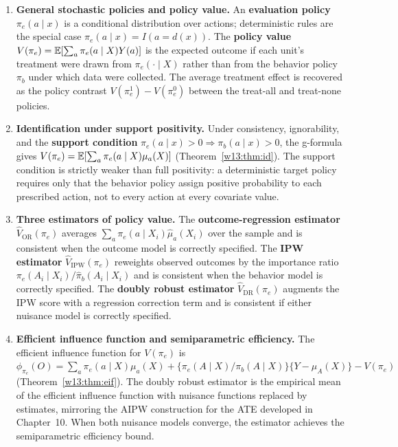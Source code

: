 \documentclass[master.tex]{subfiles}
\begin{document}
\begin{enumerate}

  \item \textbf{General stochastic policies and policy value.}
    An \textbf{evaluation policy} $\pi_e(a\mid x)$ is a conditional distribution
    over actions; deterministic rules are the special case
    $\pi_e(a\mid x)=I(a=d(x))$.  The \textbf{policy value}
    $V(\pi_e)=\mathbb{E}[\sum_a\pi_e(a\mid X)Y(a)]$ is the expected outcome if each
    unit's treatment were drawn from $\pi_e(\cdot\mid X)$ rather than from the
    behavior policy $\pi_b$ under which data were collected.  The average
    treatment effect is recovered as the policy contrast
    $V(\pi_e^1)-V(\pi_e^0)$ between the treat-all and treat-none policies.

  \item \textbf{Identification under support positivity.}
    Under consistency, ignorability, and the \textbf{support condition}
    $\pi_e(a\mid x)>0\Rightarrow\pi_b(a\mid x)>0$, the g-formula gives
    $V(\pi_e)=\mathbb{E}[\sum_a\pi_e(a\mid X)\mu_a(X)]$
    (Theorem~\ref{w13:thm:id}).  The support condition is strictly weaker
    than full positivity: a deterministic target policy requires only that
    the behavior policy assign positive probability to each prescribed action,
    not to every action at every covariate value.

  \item \textbf{Three estimators of policy value.}
    The \textbf{outcome-regression estimator} $\hat V_{\mathrm{OR}}(\pi_e)$
    averages $\sum_a\pi_e(a\mid X_i)\hat\mu_a(X_i)$ over the sample and is
    consistent when the outcome model is correctly specified.  The
    \textbf{IPW estimator} $\hat V_{\mathrm{IPW}}(\pi_e)$ reweights observed
    outcomes by the importance ratio $\pi_e(A_i\mid X_i)/\hat\pi_b(A_i\mid X_i)$
    and is consistent when the behavior model is correctly specified.  The
    \textbf{doubly robust estimator} $\hat V_{\mathrm{DR}}(\pi_e)$ augments the
    IPW score with a regression correction term and is consistent if either
    nuisance model is correctly specified.

  \item \textbf{Efficient influence function and semiparametric efficiency.}
    The efficient influence function for $V(\pi_e)$ is
    $\phi_{\pi_e}(O)=\sum_a\pi_e(a\mid X)\mu_a(X)+
    \{\pi_e(A\mid X)/\pi_b(A\mid X)\}\{Y-\mu_A(X)\}-V(\pi_e)$
    (Theorem~\ref{w13:thm:eif}).  The doubly robust estimator is the
    empirical mean of the efficient influence function with nuisance functions
    replaced by estimates, mirroring the AIPW construction for the ATE
    developed in Chapter~10.  When both nuisance models converge, the estimator
    achieves the semiparametric efficiency bound.


\end{enumerate}
\end{document}
